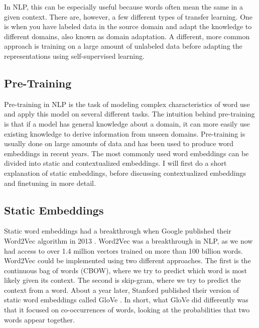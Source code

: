 In NLP, this can be especially useful because words often mean the same in a given context. There are, however, a few different types of transfer learning. One is when you have labeled data in the source domain and adapt the knowledge to different domains, also known as domain adaptation. A different, more common approach is training on a large amount of unlabeled data before adapting the representations using self-supervised learning.
\subsection{Pre-Training}
\noindent
Pre-training in NLP is the task of modeling complex characteristics of word use and apply this model on several different tasks. The intuition behind pre-training is that if a model has general knowledge about a domain, it can more easily use existing knowledge to derive information from unseen domains.
Pre-training is usually done on large amounts of data and has been used to produce word embeddings in recent years. The most commonly used word embeddings can be divided into static and contextualized embeddings. I will first do a short explanation of static embeddings, before discussing contextualized embeddings and finetuning in more detail.
\subsection{Static Embeddings}
Static word embeddings had a breakthrough when Google published their Word2Vec algorithm in 2013 \cite{mikolov2013efficient}. Word2Vec was a breakthrough in NLP, as we now had access to over 1.4 million vectors trained on more than 100 billion words. Word2Vec could be implemented using two different approaches. The first is the continuous bag of words (CBOW), where we try to predict which word is most likely given its context. The second is skip-gram, where we try to predict the context from a word. About a year later, Stanford published their version of static word embeddings called GloVe \cite{pennington2014glove}. In short, what GloVe did differently was that it focused on co-occurrences of words, looking at the probabilities that two words appear together.

